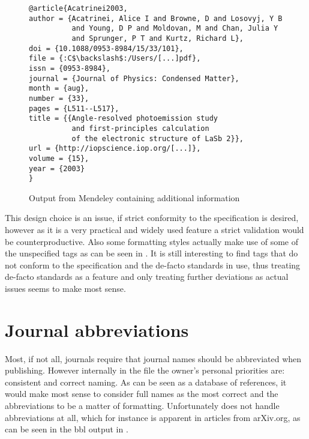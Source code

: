 \begin{figure}
  \centering
\begin{small}
\begin{verbatim}
@article{Acatrinei2003,
author = {Acatrinei, Alice I and Browne, D and Losovyj, Y B
          and Young, D P and Moldovan, M and Chan, Julia Y
          and Sprunger, P T and Kurtz, Richard L},
doi = {10.1088/0953-8984/15/33/101},
file = {:C$\backslash$:/Users/[...]pdf},
issn = {0953-8984},
journal = {Journal of Physics: Condensed Matter},
month = {aug},
number = {33},
pages = {L511--L517},
title = {{Angle-resolved photoemission study
          and first-principles calculation
          of the electronic structure of LaSb 2}},
url = {http://iopscience.iop.org/[...]},
volume = {15},
year = {2003}
}
\end{verbatim}
\end{small}
  \caption{Output from Mendeley containing additional information}
\label{fig:mendeley_output}
\end{figure}

This design choice is an issue, if strict conformity to the
specification is desired, however as it is a very practical and widely
used feature a strict validation would be counterproductive.  Also
some formatting styles actually make use of some of the unspecified
tags as can be seen in . It is still
interesting to find tags that do not conform to the specification and
the de-facto standards in use, thus treating de-facto standards as a
feature and only treating further deviations as actual issues seems to
make most sense.


\section{Journal abbreviations}
\label{sec:problems_abbreviations}



Most, if not all, journals require that journal names should be
abbreviated when publishing.  However internally in the {\bibtex} file
the owner's personal priorities are: consistent and correct naming.
As {\bibtex} can be seen as a database of references, it would make
most sense to consider full names as the most correct and the
abbreviations to be a matter of formatting.  Unfortunately {\bibtex}
does not handle abbreviations at all, which for instance is apparent
in articles from arXiv.org, as can be seen in the bbl output in
.

